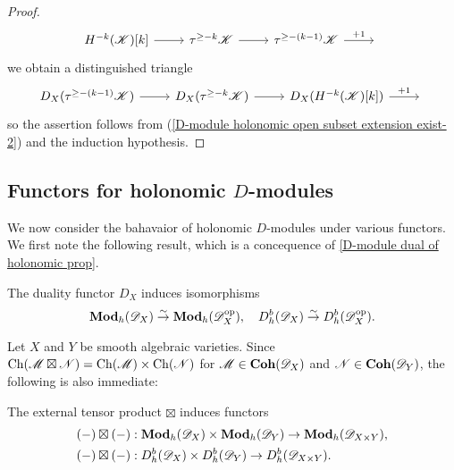 \begin{proof}
\[\begin{tikzcd}
H^{-k}(\mathscr{K})[k]\ar[r]&\tau^{\geq-k}\mathscr{K}\ar[r]&\tau^{\geq-(k-1)}\mathscr{K}\ar[r,"+1"]&{}
\end{tikzcd}\]
we obtain a distinguished triangle
\[\begin{tikzcd}
D_X(\tau^{\geq-(k-1)}\mathscr{K})\ar[r]&D_X(\tau^{\geq-k}\mathscr{K})\ar[r]&D_X(H^{-k}(\mathscr{K})[k])\ar[r,"+1"]&{}
\end{tikzcd}\]
so the assertion follows from (\ref{D-module holonomic open subset extension exist-2}) and the induction hypothesis.
\end{proof}

\subsection{Functors for holonomic \texorpdfstring{$D$}{D}-modules}
We now consider the bahavaior of holonomic $D$-modules under various functors. We first note the following result, which is a concequence of \cref{D-module dual of holonomic prop}.

\begin{proposition}\label{D-module holonomic duality preserve}
The duality functor $D_X$ induces isomorphisms
\[\mathbf{Mod}_h(\mathscr{D}_X)\stackrel{\sim}{\to} \mathbf{Mod}_h(\mathscr{D}_X^{\mathrm{op}}),\quad D^b_h(\mathscr{D}_X)\stackrel{\sim}{\to} D^b_h(\mathscr{D}_X^{\mathrm{op}}).\]
\end{proposition}

Let $X$ and $Y$ be smooth algebraic varieties. Since $\mathrm{Ch}(\mathscr{M}\boxtimes\mathscr{N})=\mathrm{Ch}(\mathscr{M})\times\mathrm{Ch}(\mathscr{N})$ for $\mathscr{M}\in\mathbf{Coh}(\mathscr{D}_X)$ and $\mathscr{N}\in\mathbf{Coh}(\mathscr{D}_Y)$, the following is also immediate:
\begin{proposition}\label{D-module holonomic external product functor}
The external tensor product $\boxtimes$ induces functors
\begin{align*}
(-)\boxtimes(-)&:\mathbf{Mod}_h(\mathscr{D}_X)\times\mathbf{Mod}_h(\mathscr{D}_Y)\to \mathbf{Mod}_h(\mathscr{D}_{X\times Y}),\\
(-)\boxtimes(-)&:D^b_h(\mathscr{D}_X)\times D^b_h(\mathscr{D}_Y)\to D^b_h(\mathscr{D}_{X\times Y}).
\end{align*}
\end{proposition}

